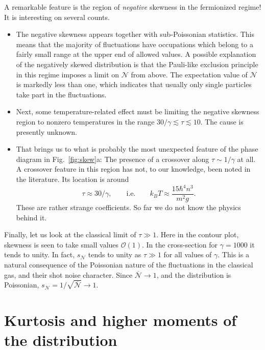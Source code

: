 \documentclass[aps,twocolumn,pra,superscriptaddress,nofootinbib,amsmath,amssymb,floats,floatfix,english]{revtex4-1}
\newcommand{\mc}[1]{{\mathcal{#1}}}
\newcommand{\wb}[1]{{\overline{#1}}}
\renewcommand{\eq}[2]{\begin{equation}\label{#1}#2\end{equation}}
\begin{document}
A remarkable feature is the region of \emph{negative} skewness in the fermionized regime! It is interesting on several counts. 
\begin{itemize}
\item 
The negative skewness appears together with sub-Poissonian statistics.
This means that the majority of fluctuations have occupations which belong to a fairly small range at the upper end of allowed
values.
A possible explanation of the negatively skewed distribution is that the Pauli-like exclusion principle in this regime imposes
a limit on $\mc{N}$ from above. The expectation value of $\mc{N}$ is markedly less than one, which indicates that usually only
single particles take part in the fluctuations.
\item Next, some temperature-related effect must be limiting the negative skewness region to nonzero temperatures in the range $30/\gamma\lesssim\tau\lesssim10$. The cause is presently unknown.
\item That brings us to what is probably the most unexpected feature of the phase diagram in Fig.~\ref{fig:skew}a: The presence of a  crossover along $\tau\sim1/\gamma$ at all. A crossover feature in this region has not,  to our knowledge, been noted in the literature. 
Its location is around 
\eq{xover}{
\tau \approx 30/\gamma, \qquad \text{i.e.} \qquad  
k_BT \approx \frac{15\hbar^4n^3}{m^2g}.
} 
These are rather strange coefficients. So far we do not know the physics behind it. 
\end{itemize}

Finally, let us look at the classical limit of $\tau\gg1$. Here in the contour plot, skewness is seen to take small values $\mc{O}(1)$.  
In the cross-section for $\gamma=1000$ it tends to unity. In fact, $s_{\mc{N}}$ tends to unity as $\tau\gg1$ for all values of $\gamma$. This is a natural consequence of the Poissonian nature of the fluctuations in the classical gas, and their shot noise character. Since $\mc{\wb{N}}\to1$, and the distribution is Poissonian, $s_{\mc{N}}=1/\sqrt{\wb{\mc{N}}} \to 1$.


\section{Kurtosis and higher moments of the distribution}
\label{KURT}
\end{document}
